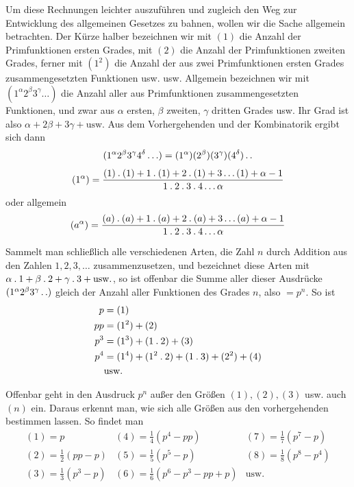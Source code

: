 Um diese Rechnungen leichter auszuführen und zugleich den Weg zur Entwicklung des allgemeinen Gesetzes zu bahnen, wollen wir die Sache allgemein betrachten. Der Kürze halber bezeichnen wir mit $(1)$ die Anzahl der Primfunktionen ersten Grades, mit $(2)$ die Anzahl der Primfunktionen zweiten Grades, ferner mit $(1^2)$ die Anzahl der aus zwei Primfunktionen ersten Grades zusammengesetzten Funktionen usw. usw. Allgemein bezeichnen wir mit $(1^\alpha2^\beta3^\gamma\ldots)$ die Anzahl aller aus Primfunktionen zusammengesetzten Funktionen, und zwar aus $\alpha$ ersten, $\beta$ zweiten, $\gamma$ dritten Grades usw. Ihr Grad ist also $\alpha+2\beta+3\gamma+\text{usw.}$ Aus dem Vorhergehenden und der Kombinatorik ergibt sich dann
\[
(1^\alpha2^\beta3^\gamma4^\delta\ldots)=(1^\alpha)(2^\beta)(3^\gamma)(4^\delta)\mathinner{.\,.}
\]
\[
(1^\alpha)=\frac{(1)\mathbin{.}(1)+1\mathbin{.}(1)+2\mathbin{.}(1)+3\ldots(1)+\alpha-1}{1\mathbin{.}2\mathbin{.}3\mathbin{.}4\ldots\alpha}
\]
oder allgemein
\[
(a^\alpha)=\frac{(a)\mathbin{.}(a)+1\mathbin{.}(a)+2\mathbin{.}(a)+3\ldots(a)+\alpha-1}{1\mathbin{.}2\mathbin{.}3\mathbin{.}4\ldots\alpha}
\]

Sammelt man schließlich alle verschiedenen Arten, die Zahl $n$ durch Addition aus den Zahlen $1,2,3,\ldots$ zusammenzusetzen, und bezeichnet diese Arten mit $\alpha\mathbin{.}1+\beta\mathbin{.}2+\gamma\mathbin{.}3+\text{usw.}$, so ist offenbar die Summe aller dieser Ausdrücke $(1^\alpha2^\beta3^\gamma\mathinner{.\,.})$ gleich der Anzahl aller Funktionen des Grades $n$, also $=p^n$. So ist
\[
\begin{aligned}
p&=(1)\\
pp&=(1^2)+(2)\\
p^3&=(1^3)+(1\mathbin{.}2)+(3)\\
p^4&=(1^4)+(1^2\mathbin{.}2)+(1\mathbin{.}3)+(2^2)+(4)\\
&\text{usw.}
\end{aligned}
\]

Offenbar geht in den Ausdruck $p^n$ außer den Größen $(1),(2),(3)$ usw. auch
$(n)$ ein. Daraus erkennt man, wie sich alle Größen aus den vorhergehenden bestimmen lassen. So findet man
\[
\begin{array}{lll}
(1)=p&(4)=\frac14(p^4-pp)&(7)=\frac17(p^7-p)\\
(2)=\frac12(pp-p)&(5)=\frac15(p^5-p)&(8)=\frac18(p^8-p^4)\\
(3)=\frac13(p^3-p)&(6)=\frac16(p^6-p^3-pp+p)&\text{usw.}
\end{array}
\]

